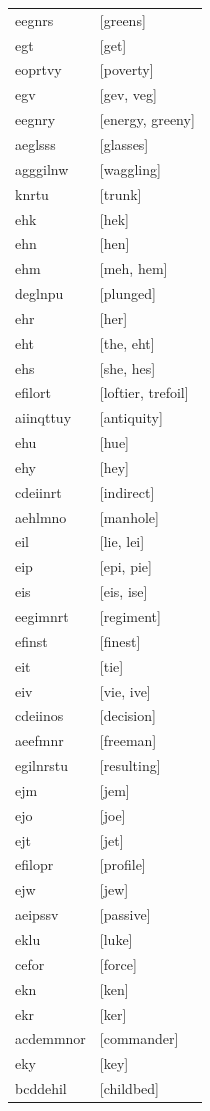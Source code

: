 \documentclass{article}
\begin{document}
\begin{tabular}{ll}
eegnrs & [greens] \\
egt & [get] \\
eoprtvy & [poverty] \\
egv & [gev, veg] \\
eegnry & [energy, greeny] \\
aeglsss & [glasses] \\
agggilnw & [waggling] \\
knrtu & [trunk] \\
ehk & [hek] \\
ehn & [hen] \\
ehm & [meh, hem] \\
deglnpu & [plunged] \\
ehr & [her] \\
eht & [the, eht] \\
ehs & [she, hes] \\
efilort & [loftier, trefoil] \\
aiinqttuy & [antiquity] \\
ehu & [hue] \\
ehy & [hey] \\
cdeiinrt & [indirect] \\
aehlmno & [manhole] \\
eil & [lie, lei] \\
eip & [epi, pie] \\
eis & [eis, ise] \\
eegimnrt & [regiment] \\
efinst & [finest] \\
eit & [tie] \\
eiv & [vie, ive] \\
cdeiinos & [decision] \\
aeefmnr & [freeman] \\
egilnrstu & [resulting] \\
ejm & [jem] \\
ejo & [joe] \\
ejt & [jet] \\
efilopr & [profile] \\
ejw & [jew] \\
aeipssv & [passive] \\
eklu & [luke] \\
cefor & [force] \\
ekn & [ken] \\
ekr & [ker] \\
acdemmnor & [commander] \\
eky & [key] \\
bcddehil & [childbed] \\

\end{tabular}
\end{document}
